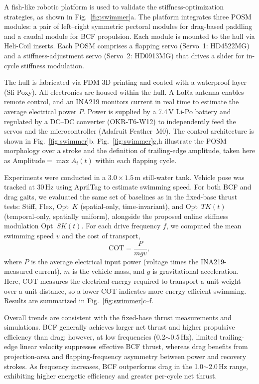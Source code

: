 A fish-like robotic platform is used to validate the stiffness-optimization strategies, as shown in Fig.~\ref{fig:swimmer}a. The platform integrates three POSM modules: a pair of left--right symmetric pectoral modules for drag-based paddling and a caudal module for BCF propulsion. Each module is mounted to the hull via Heli-Coil inserts. Each POSM comprises a flapping servo (Servo~1: HD4522MG) and a stiffness-adjustment servo (Servo~2: HD0913MG) that drives a slider for in-cycle stiffness modulation.

The hull is fabricated via FDM 3D printing and coated with a waterproof layer (Sli-Poxy). All electronics are housed within the hull. A LoRa antenna enables remote control, and an INA219 monitors current in real time to estimate the average electrical power \(P\). Power is supplied by a 7.4\,V Li-Po battery and regulated by a DC--DC converter (OKR-T6-W12) to independently feed the servos and the microcontroller (Adafruit Feather~M0). The control architecture is shown in Fig.~\ref{fig:swimmer}b. Fig.~\ref{fig:swimmer}g,h illustrate the POSM morphology over a stroke and the definition of trailing-edge amplitude, taken here as \(\text{Amplitude}=\max A_i(t)\) within each flapping cycle.

Experiments were conducted in a $3.0 \times 1.5\,\mathrm{m}$ still-water tank. Vehicle pose was tracked at 30\,Hz using AprilTag to estimate swimming speed. For both BCF and drag gaits, we evaluated the same set of baselines as in the fixed-base thrust tests: Stiff, Flex, Opt~\(K\) (spatial-only, time-invariant), and Opt~\(TK(t)\) (temporal-only, spatially uniform), alongside the proposed online stiffness modulation Opt~\(SK(t)\). For each drive frequency \(f\), we computed the mean swimming speed \(v\) and the cost of transport,
\begin{equation}
\mathrm{COT}=\frac{P}{m g v},
\end{equation}
where \(P\) is the average electrical input power (voltage times the INA219-measured current), \(m\) is the vehicle mass, and \(g\) is gravitational acceleration. Here, COT measures the electrical energy required to transport a unit weight over a unit distance, so a lower COT indicates more energy-efficient swimming. Results are summarized in Fig.~\ref{fig:swimmer}c--f.

Overall trends are consistent with the fixed-base thrust measurements and simulations. BCF generally achieves larger net thrust and higher propulsive efficiency than drag; however, at low frequencies (0.2$\sim$0.5\,Hz), limited trailing-edge linear velocity suppresses effective BCF thrust, whereas drag benefits from projection-area and flapping-frequency asymmetry between power and recovery strokes. As frequency increases, BCF outperforms drag in the 1.0$\sim$2.0\,Hz range, exhibiting higher energetic efficiency and greater per-cycle net thrust.

